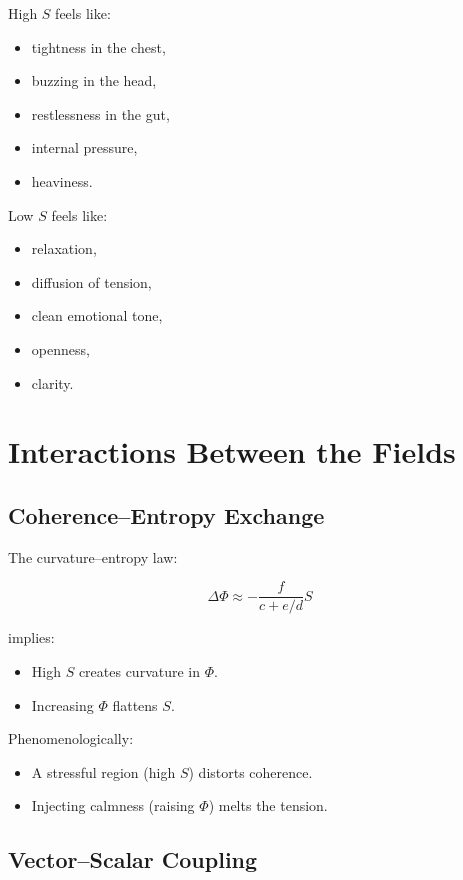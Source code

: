 \documentclass[12pt]{article}
\begin{document}
High $S$ feels like:

\begin{itemize}
    \item tightness in the chest,
    \item buzzing in the head,
    \item restlessness in the gut,
    \item internal pressure,
    \item heaviness.
\end{itemize}

Low $S$ feels like:

\begin{itemize}
    \item relaxation,
    \item diffusion of tension,
    \item clean emotional tone,
    \item openness,
    \item clarity.
\end{itemize}

\section{Interactions Between the Fields}

\subsection{Coherence--Entropy Exchange}

The curvature--entropy law:

\[
\Delta \Phi \approx -\frac{f}{c + e/d} S
\]

implies:

\begin{itemize}
    \item High $S$ creates curvature in $\Phi$.
    \item Increasing $\Phi$ flattens $S$.
\end{itemize}

Phenomenologically:

\begin{itemize}
    \item A stressful region (high $S$) distorts coherence.
    \item Injecting calmness (raising $\Phi$) melts the tension.
\end{itemize}

\subsection{Vector–Scalar Coupling}
\end{document}
